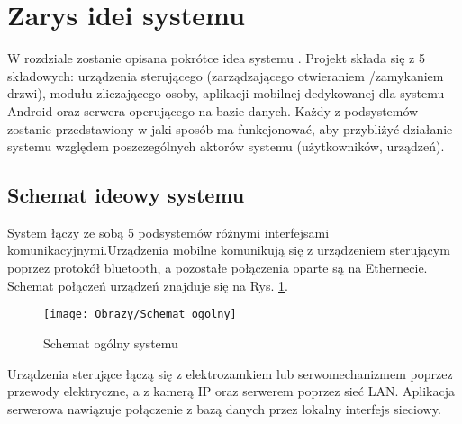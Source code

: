 % 
\newpage\section{Zarys idei systemu \textsl{\NazwaSys}}\label{sec:ideasystemu}
W rozdziale zostanie opisana pokrótce idea systemu \NazwaSys. Projekt składa się z 5 składowych: urządzenia sterującego (zarządzającego otwieraniem /zamykaniem drzwi), modułu zliczającego osoby, aplikacji mobilnej dedykowanej dla systemu Android oraz serwera operującego na bazie danych. Każdy z podsystemów zostanie przedstawiony w jaki sposób ma funkcjonować, aby przybliżyć działanie systemu względem poszczególnych aktorów systemu (użytkowników, urządzeń).

\subsection{Schemat ideowy systemu \textsl{\NazwaSys}}
System łączy ze sobą 5 podsystemów różnymi interfejsami komunikacyjnymi.Urządzenia mobilne komunikują się z urządzeniem sterującym poprzez protokół bluetooth, a pozostałe połączenia oparte są na Ethernecie. Schemat połączeń urządzeń znajduje się na Rys. \ref{Schemat ogólny systemu}.

\begin{figure}[!h]
	\centering
	\texttt{[image: Obrazy/Schemat\_ogolny]}
	\caption{Schemat ogólny systemu}
	\label{Schemat ogólny systemu}
\end{figure}

Urządzenia sterujące łączą się z elektrozamkiem lub serwomechanizmem poprzez przewody elektryczne, a z kamerą IP oraz serwerem poprzez sieć LAN. Aplikacja serwerowa nawiązuje połączenie z bazą danych przez lokalny interfejs sieciowy.

